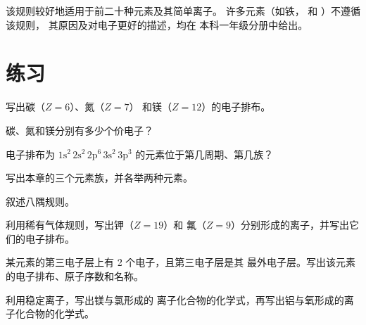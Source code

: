 \begin{remark}[规则的局限]\label{rem:g10:electron-shells:limits}
该规则较好地适用于前二十种元素及其简单离子。
许多元素（如铁， 和 ）不遵循该规则，
其原因及对电子更好的描述，均在
本科一年级分册中给出。
\end{remark}

\section{练习}

\begin{exercise}[$\star$]\label{exo:g10:electron-shells:1}
写出碳（$Z = 6$）、氮（$Z = 7$）
和镁（$Z = 12$）的电子排布。
\end{exercise}

\begin{exercise}[$\star$]\label{exo:g10:electron-shells:2}
碳、氮和镁分别有多少个价电子？
\end{exercise}

\begin{exercise}[$\star$]\label{exo:g10:electron-shells:3}
电子排布为
$1\mathrm{s}^2\,2\mathrm{s}^2\,2\mathrm{p}^6\,3\mathrm{s}^2\,3\mathrm{p}^3$ 的元素位于第几周期、第几族？
\end{exercise}

\begin{exercise}[$\star$]\label{exo:g10:electron-shells:4}
写出本章的三个元素族，并各举两种元素。
\end{exercise}

\begin{exercise}[$\star$]\label{exo:g10:electron-shells:5}
叙述八隅规则。
\end{exercise}

\begin{exercise}[$\star\star$]\label{exo:g10:electron-shells:6}
利用稀有气体规则，写出钾（$Z = 19$）和
氟（$Z = 9$）分别形成的离子，并写出它们的电子排布。
\end{exercise}

\begin{exercise}[$\star\star$]\label{exo:g10:electron-shells:7}
某元素的第三电子层上有 2 个电子，且第三电子层是其
最外电子层。写出该元素的电子排布、原子序数和名称。
\end{exercise}

\begin{exercise}[$\star\star$]\label{exo:g10:electron-shells:8}
利用稳定离子，写出镁与氯形成的
离子化合物的化学式，再写出铝与氧形成的离子化合物的化学式。
\end{exercise}

